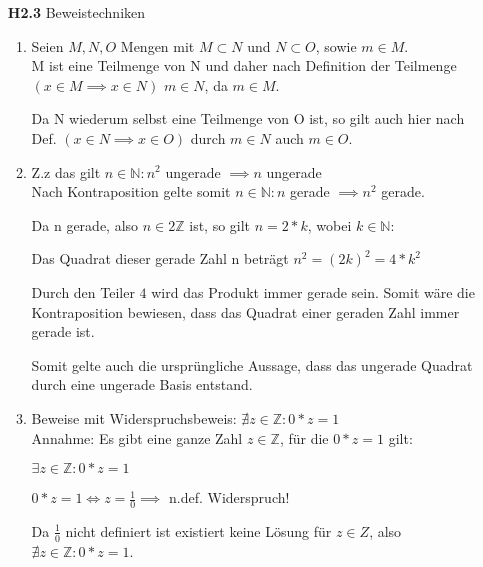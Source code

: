 \documentclass[a4paper,abstract,german]{scrreprt}
\newcommand{\N}{\mathbb{N}}
\newcommand{\Z}{\mathbb{Z}}
\begin{document}
\begin{enumerate}
		\item[\textbf {H2.3}]
	Beweistechniken
	\begin{enumerate}
	\item
    	Seien $M,N, O$ Mengen mit $M \subset N$ und $N \subset O$, sowie $m \in M$.\\
    	
    	M ist eine Teilmenge von N und daher nach Definition der Teilmenge $(x \in M \implies x \in N)$ $m \in N$, da $m \in M$.
    	
    	Da N wiederum selbst eine Teilmenge von O ist, so gilt auch hier nach Def. $(x \in N \implies x \in O)$ durch $m \in N$ auch $m \in O$.
    
    \item
    	Z.z das gilt $n \in \mathbb{N}: n^2$ ungerade $\implies n$ ungerade\\  
    	Nach Kontraposition gelte somit $ n \in \mathbb{N}: n$ gerade $\implies n^2$ gerade.
    	
    	Da n gerade, also $n \in 2\Z$ ist, so gilt $n = 2*k$, wobei $k \in \N $:
    	
    	Das Quadrat dieser gerade Zahl n beträgt $ n^2 = (2k)^2 = 4*k^2 $
    	
    	Durch den Teiler $4$ wird das Produkt immer gerade sein. Somit wäre die Kontraposition bewiesen, dass das Quadrat einer geraden Zahl immer gerade ist.
    	
    	Somit gelte auch die ursprüngliche Aussage, dass das ungerade Quadrat durch eine ungerade Basis entstand.
    	
    \item
        Beweise mit Widerspruchsbeweis: $\nexists z \in \Z: 0*z=1$\\

    	Annahme: Es gibt eine ganze Zahl $z \in \Z$, für die $0*z=1$ gilt:
    	
    	$\exists z \in \Z: 0*z=1$
    	
    	$0*z=1 \iff z = \frac{1}{0} \implies $ n.def. Widerspruch!
    	
    	
    	Da $\frac{1}{0}$ nicht definiert ist existiert keine Lösung für $z \in Z$, also $\nexists z \in \Z: 0*z=1$.

	\end{enumerate}

\end{enumerate}
\end{document}

